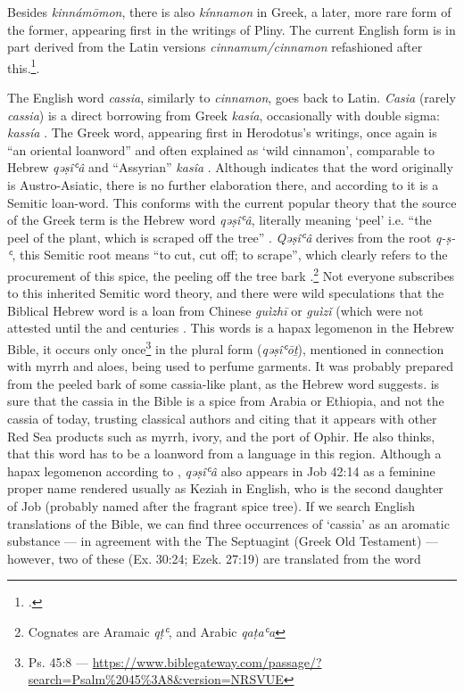 Besides \textit{kinnámōmon}, there is also  \textit{kínnamon} in Greek, a later, more rare form of the former, appearing first in the writings of Pliny. The current English form is in part derived from the Latin versions \textit{cinnamum/cinnamon} refashioned after this.\footcite[cinnamon]{hoad_concise_2003}.



The English word \textit{cassia}, similarly to \textit{cinnamon}, goes back to Latin. \textit{Casia} (rarely \textit{cassia}) is a direct borrowing from Greek  \textit{kasía}, occasionally with double sigma:  \textit{kassía} . The Greek word, appearing first in Herodotus’s writings, once again is ``an oriental loanword'' and often explained as `wild cinnamon', comparable to Hebrew  \textit{qəṣîʿâ} and ``Assyrian'' \textit{kasîa} \parencite[653]{beekes_etymological_2010}. Although \textcite{beekes_etymological_2010} indicates that the word originally is Austro-Asiatic, there is no further elaboration there, and according to \textcite[342]{welles_royal_1934} it is a Semitic loan-word. This conforms with the current popular theory that the source of the Greek term is the Hebrew word \textit{qəṣîʿâ}, literally meaning `peel’ i.e. ``the peel of the plant, which is scraped off the tree'' \parencite[589]{klein_comprehensive_1987}. \textit{Qəṣîʿâ} derives from the root \textit{q-ṣ-ʿ}, this Semitic root means ``to cut, cut off; to scrape'', which clearly refers to the procurement of this spice, the peeling off the tree bark \parencite{klein_comprehensive_1987}.\footnote{Cognates are Aramaic 
\textit{qṭʿ}, and Arabic 
\textit{qaṭaʿa}} Not everyone subscribes to this inherited Semitic word theory, and there were wild speculations that the Biblical Hebrew word is a loan from Chinese  \textit{guìzhī} or  \textit{guìzǐ} (which were not attested until the  and  centuries \parencite[197]{noonan_non-semitic_2019}. This words is a hapax legomenon in the Hebrew Bible, it occurs only once\footnote{Ps. 45:8 --- \url{https://www.biblegateway.com/passage/?search=Psalm\%2045\%3A8&version=NRSVUE}} in the plural form (\textit{qəṣîʿōṯ}), mentioned in connection with myrrh and aloes, being used to perfume garments. It was probably prepared from the peeled bark of some cassia-like plant, as the Hebrew word suggests. \parencite[196]{noonan_non-semitic_2019} is sure that the cassia in the Bible is a spice from Arabia or Ethiopia, and not the cassia of today, trusting classical authors and citing that it appears with other Red Sea products such as myrrh, ivory, and the port of Ophir. He also thinks, that this word has to be a loanword from a language in this region. Although a hapax legomenon according to \textcite{klein_comprehensive_1987}, \textit{qəṣîʿâ} also appears in Job 42:14 as a feminine proper name rendered usually as Keziah in English, who is the second daughter of Job (probably named after the fragrant spice tree). If we search English translations of the Bible, we can find three occurrences of `cassia' as an aromatic substance  --- in agreement with the The Septuagint (Greek Old Testament) --- however, two of these (Ex. 30:24; Ezek. 27:19) are translated from the word 
